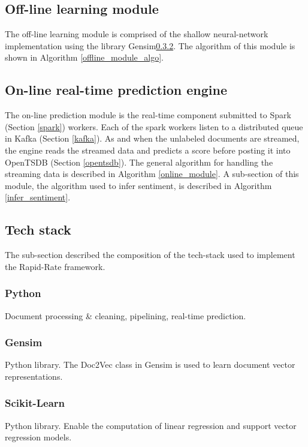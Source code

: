 \documentclass[conference]{IEEEtran}
\begin{document}
    \subsection{Off-line learning module} \label{offline_module}
        The off-line learning module is comprised of the shallow neural-network implementation using the library Gensim\ref{gensim}. 
        The algorithm of this module is shown in Algorithm \ref{offline_module_algo}.

    \subsection{On-line real-time prediction engine}
        The on-line prediction module is the real-time component submitted to Spark (Section \ref{spark}) workers. 
        Each of the spark workers listen to a distributed queue in Kafka (Section \ref{kafka}). 
        As and when the unlabeled documents are streamed, the engine reads the streamed data and predicts a score before posting it into OpenTSDB (Section \ref{opentsdb}). 
        The general algorithm for handling the streaming data is described in Algorithm \ref{online_module}. 
        A sub-section of this module, the algorithm used to infer sentiment, is described in Algorithm \ref{infer_sentiment}.

    \subsection{Tech stack} \label{Tech stack}
        The sub-section described the composition of the tech-stack used to implement the Rapid-Rate framework.

        \subsubsection{Python}
            Document processing \& cleaning, pipelining, real-time prediction\cite{python}.

        \subsubsection{Gensim} \label{gensim}
            Python library. 
            The Doc2Vec class in Gensim is used to learn document vector representations\cite{doc2vec_api}.
        
        \subsubsection{Scikit-Learn}
            Python library. 
            Enable the computation of linear regression and support vector regression models\cite{scikit_learn}.
        
\end{document}
